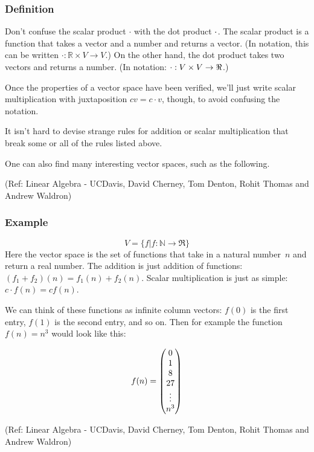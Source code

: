 \begin{frame}[fragile]
\frametitle{Definition}
\begin{remark}
Don't confuse the scalar product $\cdot$ with the dot product $\cdot$.  The scalar product is a function that takes a vector and a number and returns a vector.  (In notation, this can be written $\cdot: \mathbb{R}\times V \rightarrow V$.)  On the other hand, the dot product takes two vectors and returns a number.  (In notation: $\cdot: V\times V \rightarrow \Re$.)

Once the properties of a vector space have been verified, we'll just write scalar multiplication with juxtaposition $cv=c\cdot v$, though, to avoid confusing the notation.
\end{remark}

\begin{remark}
It isn't hard to devise strange rules for addition or scalar multiplication that break some or all of the rules listed above.

One can also find many interesting vector spaces, such as the following.
\end{remark}

\tiny{(Ref: Linear Algebra - UCDavis, David Cherney, Tom Denton, Rohit Thomas and Andrew Waldron)}


\end{frame}

\begin{frame}[fragile]
\frametitle{Example}

\begin{example}

\[V = \{f | f:\mathbb{N} \rightarrow \Re \} \]
Here the vector space is the set of functions that take in a natural number~$n$ and return a real number.  The addition is just addition of functions: $(f_1 + f_2)(n) = f_1(n) + f_2(n)$.  Scalar multiplication is just as simple: $c \cdot f(n) = cf(n)$.

We can think of these functions as infinite column vectors: $f(0)$ is the first entry, $f(1)$ is the second entry, and so on.  Then for example the function $f(n) = n^3$ would look like this:

\[
f(n) = \begin{pmatrix}0\\1\\8\\27\\ \vdots \\ n^3\end{pmatrix}
\]

\end{example}

\tiny{(Ref: Linear Algebra - UCDavis, David Cherney, Tom Denton, Rohit Thomas and Andrew Waldron)}

\end{frame}

